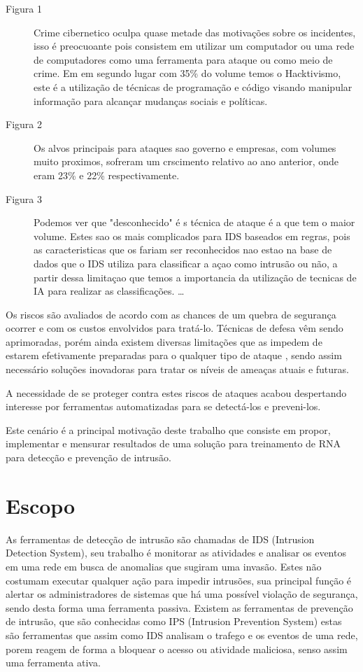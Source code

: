 \begin{description} 
	\item[Figura 1] Crime cibernetico oculpa quase metade das motivações sobre os incidentes, isso é preocuoante pois consistem em  utilizar um computador ou uma rede de computadores como uma ferramenta para ataque ou como meio de crime. Em em segundo lugar com 35\% do volume temos o Hacktivismo, este é a utilização de técnicas de
programação e código visando manipular informação para alcançar mudanças sociais e políticas.  \cite{deanalise}
	\item[Figura 2] Os alvos principais para ataques sao governo e empresas, com volumes muito proximos, sofreram um crscimento relativo ao ano anterior, onde eram  23\% e 22\% respectivamente. \cite{hackmageddon}
	\item[Figura 3] Podemos ver que "desconhecido" é s técnica de ataque é a que tem o maior volume. Estes sao os mais complicados para IDS baseados em regras, pois as caracteristicas que os fariam ser reconhecidos nao estao na base de dados que o IDS utiliza para classificar a açao como intrusão ou não, a partir dessa limitaçao que temos a importancia da utilização de tecnicas de IA para realizar as classificações.
	\ldots 
\end{description}

Os riscos são avaliados de acordo com as chances de um quebra de segurança  ocorrer e com os custos envolvidos para tratá-lo. Técnicas de defesa vêm sendo aprimoradas, porém ainda existem diversas limitações que as impedem de estarem efetivamente preparadas para o qualquer tipo de ataque \cite{CeC}, sendo assim necessário  soluções inovadoras para tratar os níveis de ameaças atuais e futuras. 

A necessidade de se proteger contra estes riscos de ataques acabou despertando interesse por ferramentas automatizadas para se detectá-los e preveni-los.

Este cenário é a principal motivação deste trabalho que consiste em propor, implementar e mensurar resultados de uma solução para treinamento de RNA para detecção e prevenção de intrusão.





\section{Escopo}

As ferramentas de detecção de intrusão são chamadas de IDS (Intrusion Detection System), seu trabalho é monitorar as atividades e analisar os eventos em uma rede em busca de anomalias que sugiram uma invasão. Estes não costumam executar qualquer ação para impedir intrusões, sua principal função é alertar os administradores de sistemas que há uma possível violação de segurança, sendo desta forma uma ferramenta passiva.
Existem as ferramentas de prevenção de intrusão, que são conhecidas como IPS (Intrusion Prevention System) estas são ferramentas que assim como IDS analisam o trafego e os eventos de uma rede, porem reagem de forma a bloquear o acesso ou atividade maliciosa, senso assim uma ferramenta ativa.

